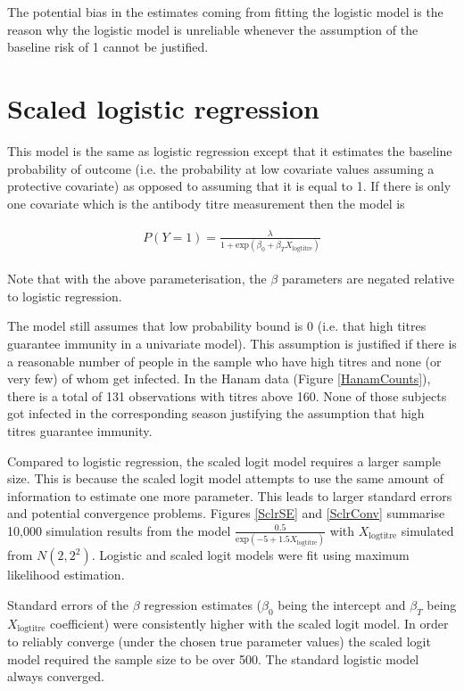 \documentclass[12pt]{article}
\begin{document}
The potential bias in the estimates coming from fitting the logistic model is the reason why the logistic model is unreliable whenever the assumption of the baseline risk of 1 cannot be justified.

\pagebreak
%
\section{Scaled logistic regression}

This model is the same as logistic regression except that it estimates the baseline probability of outcome (i.e. the probability at low covariate values assuming a protective covariate) as opposed to assuming that it is equal to 1. If there is only one covariate which is the antibody titre measurement then the model is

\begin{align*}
\begin{gathered}
P(Y=1) = \frac{\lambda}{1 + \text{exp}(\beta_0 + \beta_T X_{\text{logtitre}})}
\end{gathered}
\end{align*}

Note that with the above parameterisation, the $\beta$ parameters are negated relative to logistic regression.

The model still assumes that low probability bound is 0 (i.e. that high titres guarantee immunity in a univariate model). This assumption is justified if there is a reasonable number of people in the sample who have high titres and none (or very few) of whom get infected. In the Hanam data (Figure \ref{HanamCounts}), there is a total of 131 observations with titres above 160. None of those subjects got infected in the corresponding season justifying the assumption that high titres guarantee immunity.

Compared to logistic regression, the scaled logit model requires a larger sample size. This is because the scaled logit model attempts to use the same amount of information to estimate one more parameter. This leads to larger standard errors and potential convergence problems. Figures \ref{SclrSE} and \ref{SclrConv} summarise 10,000 simulation results from the model $\frac{0.5}{\text{exp}(-5 + 1.5 X_{\text{logtitre}})}$ with $X_{\text{logtitre}}$ simulated from $N(2, 2^2)$. Logistic and scaled logit models were fit using maximum likelihood estimation. 

Standard errors of the $\beta$ regression estimates ($\beta_0$ being the intercept and $\beta_T$ being $X_{\text{logtitre}}$ coefficient) were consistently higher with the scaled logit model. In order to reliably converge (under the chosen true parameter values) the scaled logit model required the sample size to be over 500. The standard logistic model always converged.
\end{document}
